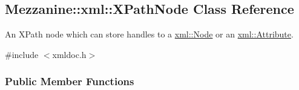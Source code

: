 \hypertarget{classMezzanine_1_1xml_1_1XPathNode}{
\subsection{Mezzanine::xml::XPathNode Class Reference}
\label{classMezzanine_1_1xml_1_1XPathNode}
}


An XPath node which can store handles to a \hyperlink{classMezzanine_1_1xml_1_1Node}{xml::Node} or an \hyperlink{classMezzanine_1_1xml_1_1Attribute}{xml::Attribute}.  




{\ttfamily \#include $<$xmldoc.h$>$}

\subsubsection*{Public Member Functions}
